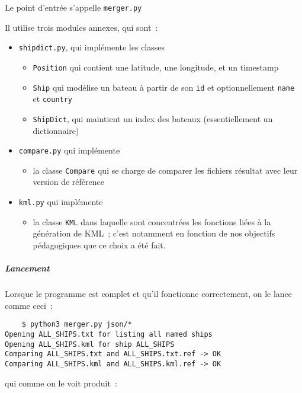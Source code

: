     Le point d'entrée s'appelle \texttt{merger.py}

Il utilise trois modules annexes, qui sont~:

\begin{itemize}
\tightlist
\item
  \texttt{shipdict.py}, qui implémente les classes

  \begin{itemize}
  \tightlist
  \item
    \texttt{Position} qui contient une latitude, une longitude, et un
    timestamp
  \item
    \texttt{Ship} qui modélise un bateau à partir de son \texttt{id} et
    optionnellement \texttt{name} et \texttt{country}
  \item
    \texttt{ShipDict}, qui maintient un index des bateaux
    (essentiellement un dictionnaire)
  \end{itemize}
\item
  \texttt{compare.py} qui implémente

  \begin{itemize}
  \tightlist
  \item
    la classe \texttt{Compare} qui se charge de comparer les fichiers
    résultat avec leur version de référence
  \end{itemize}
\item
  \texttt{kml.py} qui implémente

  \begin{itemize}
  \tightlist
  \item
    la classe \texttt{KML} dans laquelle sont concentrées les fonctions
    liées à la génération de KML~; c'est notamment en fonction de nos
    objectifs pédagogiques que ce choix a été fait.
  \end{itemize}
\end{itemize}

    \hypertarget{lancement}{%
\subparagraph{Lancement}\label{lancement}}

    Lorsque le programme est complet et qu'il fonctionne correctement, on le
lance comme ceci~:

\begin{verbatim}
    $ python3 merger.py json/*
Opening ALL_SHIPS.txt for listing all named ships
Opening ALL_SHIPS.kml for ship ALL_SHIPS
Comparing ALL_SHIPS.txt and ALL_SHIPS.txt.ref -> OK
Comparing ALL_SHIPS.kml and ALL_SHIPS.kml.ref -> OK
\end{verbatim}

qui comme on le voit produit~:

